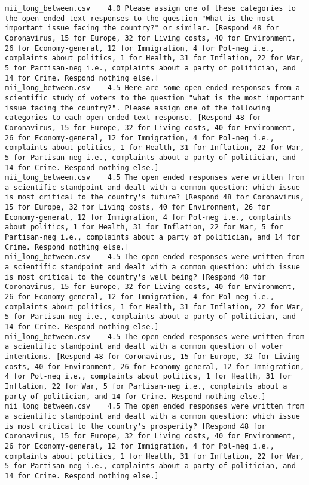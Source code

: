 \begin{lstlisting}
mii_long_between.csv	4.0	Please assign one of these categories to the open ended text responses to the question "What is the most important issue facing the country?" or similar. [Respond 48 for Coronavirus, 15 for Europe, 32 for Living costs, 40 for Environment, 26 for Economy-general, 12 for Immigration, 4 for Pol-neg i.e., complaints about politics, 1 for Health, 31 for Inflation, 22 for War, 5 for Partisan-neg i.e., complaints about a party of politician, and 14 for Crime. Respond nothing else.]
mii_long_between.csv	4.5	Here are some open-ended responses from a scientific study of voters to the question "what is the most important issue facing the country?". Please assign one of the following categories to each open ended text response. [Respond 48 for Coronavirus, 15 for Europe, 32 for Living costs, 40 for Environment, 26 for Economy-general, 12 for Immigration, 4 for Pol-neg i.e., complaints about politics, 1 for Health, 31 for Inflation, 22 for War, 5 for Partisan-neg i.e., complaints about a party of politician, and 14 for Crime. Respond nothing else.]
mii_long_between.csv	4.5	The open ended responses were written from a scientific standpoint and dealt with a common question: which issue is most critical to the country's future? [Respond 48 for Coronavirus, 15 for Europe, 32 for Living costs, 40 for Environment, 26 for Economy-general, 12 for Immigration, 4 for Pol-neg i.e., complaints about politics, 1 for Health, 31 for Inflation, 22 for War, 5 for Partisan-neg i.e., complaints about a party of politician, and 14 for Crime. Respond nothing else.]
mii_long_between.csv	4.5	The open ended responses were written from a scientific standpoint and dealt with a common question: which issue is most critical to the country's well being? [Respond 48 for Coronavirus, 15 for Europe, 32 for Living costs, 40 for Environment, 26 for Economy-general, 12 for Immigration, 4 for Pol-neg i.e., complaints about politics, 1 for Health, 31 for Inflation, 22 for War, 5 for Partisan-neg i.e., complaints about a party of politician, and 14 for Crime. Respond nothing else.]
mii_long_between.csv	4.5	The open ended responses were written from a scientific standpoint and dealt with a common question of voter intentions. [Respond 48 for Coronavirus, 15 for Europe, 32 for Living costs, 40 for Environment, 26 for Economy-general, 12 for Immigration, 4 for Pol-neg i.e., complaints about politics, 1 for Health, 31 for Inflation, 22 for War, 5 for Partisan-neg i.e., complaints about a party of politician, and 14 for Crime. Respond nothing else.]
mii_long_between.csv	4.5	The open ended responses were written from a scientific standpoint and dealt with a common question: which issue is most critical to the country's prosperity? [Respond 48 for Coronavirus, 15 for Europe, 32 for Living costs, 40 for Environment, 26 for Economy-general, 12 for Immigration, 4 for Pol-neg i.e., complaints about politics, 1 for Health, 31 for Inflation, 22 for War, 5 for Partisan-neg i.e., complaints about a party of politician, and 14 for Crime. Respond nothing else.]

\end{lstlisting}
